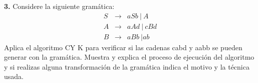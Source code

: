 \textbf{3.} Considere la siguiente gramática:
\begin{eqnarray*}
  S &\rightarrow& aSb\ |\ A\\
  A &\rightarrow& aAd\ |\ cBd\\
  B &\rightarrow& aBb\ | ab
\end{eqnarray*}
Aplica el algoritmo CY K para verificar si las cadenas cabd y aabb se pueden generar con la gramática.
Muestra y explica el proceso de ejecución del algoritmo y si realizas alguna transformación de la gramática
indica el motivo y la técnica usada.
